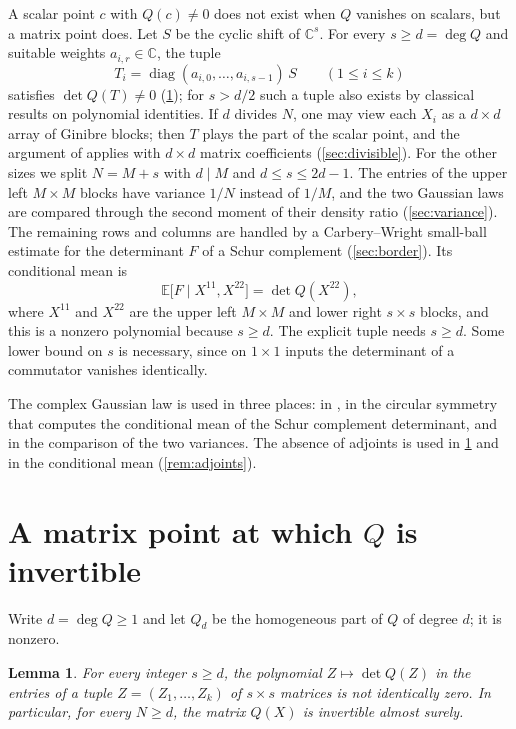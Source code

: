 \documentclass[11pt]{article}
\newtheorem{lemma}[theorem]{Lemma}
\theoremstyle{remark}
\newcommand{\C}{\mathbb C}
\newcommand{\E}{\mathbb E}
\DeclareMathOperator{\diag}{diag}
\begin{document}
A scalar point $c$ with $Q(c)\ne0$ does not exist when $Q$ vanishes on scalars, but a matrix point does. Let $S$ be the cyclic shift of $\C^s$. For every $s\ge d=\deg Q$ and suitable weights $a_{i,r}\in\C$, the tuple
\[
T_i=\diag(a_{i,0},\dots,a_{i,s-1})\,S\qquad(1\le i\le k)
\]
satisfies $\det Q(T)\ne0$ (\cref{lem:point}); for $s>d/2$ such a tuple also exists by classical results on polynomial identities. If $d$ divides $N$, one may view each $X_i$ as a $d\times d$ array of Ginibre blocks; then $T$ plays the part of the scalar point, and the argument of \cite[Corollary~3.8]{CKMYZ} applies with $d\times d$ matrix coefficients (\cref{sec:divisible}). For the other sizes we split $N=M+s$ with $d\mid M$ and $d\le s\le 2d-1$. The entries of the upper left $M\times M$ blocks have variance $1/N$ instead of $1/M$, and the two Gaussian laws are compared through the second moment of their density ratio (\cref{sec:variance}). The remaining rows and columns are handled by a Carbery--Wright small-ball estimate for the determinant $F$ of a Schur complement (\cref{sec:border}). Its conditional mean is
\[
\E\bigl[F\mid X^{11},X^{22}\bigr]=\det Q(X^{22}),
\]
where $X^{11}$ and $X^{22}$ are the upper left $M\times M$ and lower right $s\times s$ blocks, and this is a nonzero polynomial because $s\ge d$. The explicit tuple needs $s\ge d$. Some lower bound on $s$ is necessary, since on $1\times1$ inputs the determinant of a commutator vanishes identically.

The complex Gaussian law is used in three places: in \cite[Theorem~3.4]{CKMYZ}, in the circular symmetry that computes the conditional mean of the Schur complement determinant, and in the comparison of the two variances. The absence of adjoints is used in \cref{sec:point} and in the conditional mean (\cref{rem:adjoints}).

\section{\texorpdfstring{A matrix point at which $Q$ is invertible}{A matrix point at which Q is invertible}}\label{sec:point}

Write $d=\deg Q\ge1$ and let $Q_d$ be the homogeneous part of $Q$ of degree $d$; it is nonzero.

\begin{lemma}\label{lem:point}
For every integer $s\ge d$, the polynomial $Z\mapsto\det Q(Z)$ in the entries of a tuple $Z=(Z_1,\dots,Z_k)$ of $s\times s$ matrices is not identically zero. In particular, for every $N\ge d$, the matrix $Q(X)$ is invertible almost surely.
\end{lemma}
\end{document}
